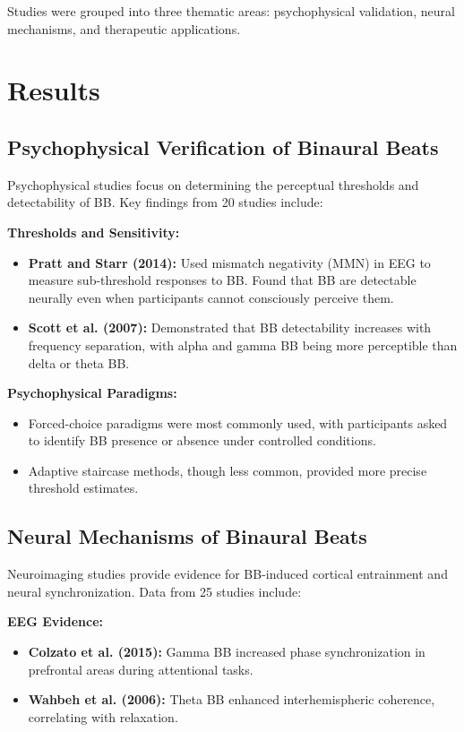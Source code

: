 \documentclass[12pt]{article}
\begin{document}
Studies were grouped into three thematic areas: psychophysical validation, neural mechanisms, and therapeutic applications.

\section{Results}

\subsection{Psychophysical Verification of Binaural Beats}
Psychophysical studies focus on determining the perceptual thresholds and detectability of BB. Key findings from 20 studies include:

\textbf{Thresholds and Sensitivity:}
\begin{itemize}
    \item \textbf{Pratt and Starr (2014):} Used mismatch negativity (MMN) in EEG to measure sub-threshold responses to BB. Found that BB are detectable neurally even when participants cannot consciously perceive them.
    \item \textbf{Scott et al. (2007):} Demonstrated that BB detectability increases with frequency separation, with alpha and gamma BB being more perceptible than delta or theta BB.
\end{itemize}

\textbf{Psychophysical Paradigms:}
\begin{itemize}
    \item Forced-choice paradigms were most commonly used, with participants asked to identify BB presence or absence under controlled conditions.
    \item Adaptive staircase methods, though less common, provided more precise threshold estimates.
\end{itemize}

\subsection{Neural Mechanisms of Binaural Beats}
Neuroimaging studies provide evidence for BB-induced cortical entrainment and neural synchronization. Data from 25 studies include:

\textbf{EEG Evidence:}
\begin{itemize}
    \item \textbf{Colzato et al. (2015):} Gamma BB increased phase synchronization in prefrontal areas during attentional tasks.
    \item \textbf{Wahbeh et al. (2006):} Theta BB enhanced interhemispheric coherence, correlating with relaxation.
\end{itemize}
\end{document}
